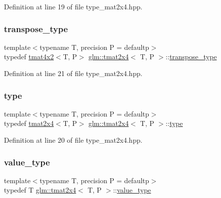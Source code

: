 Definition at line 19 of file type\+\_\+mat2x4.\+hpp.

\mbox{\label{structglm_1_1tmat2x4_a00436dc5f11ba5e0bda1286402ded8be}} 
\subsubsection{\texorpdfstring{transpose\_type}{transpose\_type}}
{\footnotesize\ttfamily template$<$typename T, precision P = defaultp$>$ \\
typedef \mbox{\hyperlink{structglm_1_1tmat4x2}{tmat4x2}}$<$T, P$>$ \mbox{\hyperlink{structglm_1_1tmat2x4}{glm\+::tmat2x4}}$<$ T, P $>$\+::\mbox{\hyperlink{structglm_1_1tmat2x4_a00436dc5f11ba5e0bda1286402ded8be}{transpose\+\_\+type}}}



Definition at line 21 of file type\+\_\+mat2x4.\+hpp.

\mbox{\label{structglm_1_1tmat2x4_a37444455c9e8f7e00973c990eec0ff21}} 
\subsubsection{\texorpdfstring{type}{type}}
{\footnotesize\ttfamily template$<$typename T, precision P = defaultp$>$ \\
typedef \mbox{\hyperlink{structglm_1_1tmat2x4}{tmat2x4}}$<$T, P$>$ \mbox{\hyperlink{structglm_1_1tmat2x4}{glm\+::tmat2x4}}$<$ T, P $>$\+::\mbox{\hyperlink{structglm_1_1tmat2x4_a37444455c9e8f7e00973c990eec0ff21}{type}}}



Definition at line 20 of file type\+\_\+mat2x4.\+hpp.

\mbox{\label{structglm_1_1tmat2x4_a3d43dfa1bcb8be0ad095350ee71b972e}} 
\subsubsection{\texorpdfstring{value\_type}{value\_type}}
{\footnotesize\ttfamily template$<$typename T, precision P = defaultp$>$ \\
typedef T \mbox{\hyperlink{structglm_1_1tmat2x4}{glm\+::tmat2x4}}$<$ T, P $>$\+::\mbox{\hyperlink{structglm_1_1tmat2x4_a3d43dfa1bcb8be0ad095350ee71b972e}{value\+\_\+type}}}



